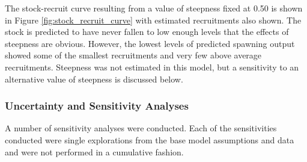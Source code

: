 \documentclass[12pt,]{article}
\begin{document}
The stock-recruit curve resulting from a value of steepness fixed at
0.50 is shown in Figure \ref{fig:stock_recruit_curve} with estimated
recruitments also shown. The stock is predicted to have never fallen to
low enough levels that the effects of steepness are obvious. However,
the lowest levels of predicted spawning output showed some of the
smallest recruitments and very few above average recruitments. Steepness
was not estimated in this model, but a sensitivity to an alternative
value of steepness is discussed below.

\subsubsection{Uncertainty and Sensitivity
Analyses}\label{uncertainty-and-sensitivity-analyses}

A number of sensitivity analyses were conducted. Each of the
sensitivities conducted were single explorations from the base model
assumptions and data and were not performed in a cumulative fashion.
\end{document}
